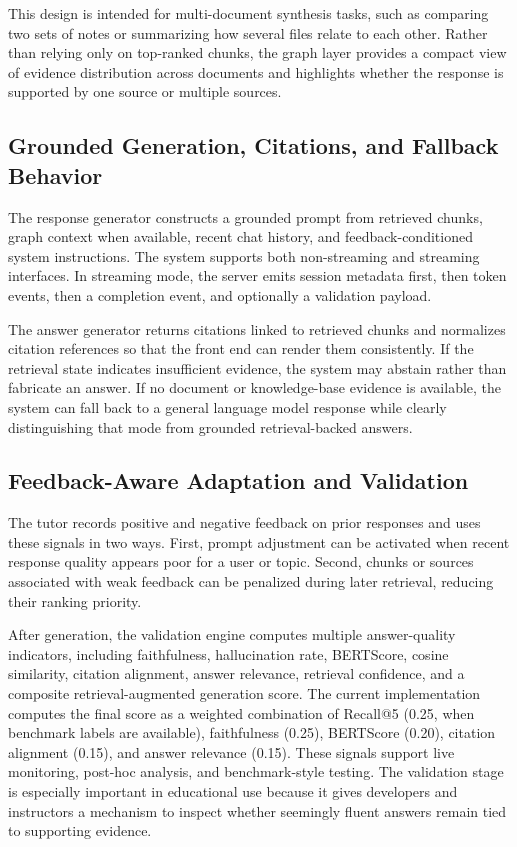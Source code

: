 \documentclass[11pt,a4paper]{article}
\begin{document}
This design is intended for multi-document synthesis tasks, such as comparing two sets of notes or summarizing how several files relate to each other. Rather than relying only on top-ranked chunks, the graph layer provides a compact view of evidence distribution across documents and highlights whether the response is supported by one source or multiple sources.

\subsection{Grounded Generation, Citations, and Fallback Behavior}

The response generator constructs a grounded prompt from retrieved chunks, graph context when available, recent chat history, and feedback-conditioned system instructions. The system supports both non-streaming and streaming interfaces. In streaming mode, the server emits session metadata first, then token events, then a completion event, and optionally a validation payload.

The answer generator returns citations linked to retrieved chunks and normalizes citation references so that the front end can render them consistently. If the retrieval state indicates insufficient evidence, the system may abstain rather than fabricate an answer. If no document or knowledge-base evidence is available, the system can fall back to a general language model response while clearly distinguishing that mode from grounded retrieval-backed answers.

\subsection{Feedback-Aware Adaptation and Validation}

The tutor records positive and negative feedback on prior responses and uses these signals in two ways. First, prompt adjustment can be activated when recent response quality appears poor for a user or topic. Second, chunks or sources associated with weak feedback can be penalized during later retrieval, reducing their ranking priority.

After generation, the validation engine computes multiple answer-quality indicators, including faithfulness, hallucination rate, BERTScore, cosine similarity, citation alignment, answer relevance, retrieval confidence, and a composite retrieval-augmented generation score. The current implementation computes the final score as a weighted combination of Recall@5 (0.25, when benchmark labels are available), faithfulness (0.25), BERTScore (0.20), citation alignment (0.15), and answer relevance (0.15). These signals support live monitoring, post-hoc analysis, and benchmark-style testing. The validation stage is especially important in educational use because it gives developers and instructors a mechanism to inspect whether seemingly fluent answers remain tied to supporting evidence.
\end{document}

